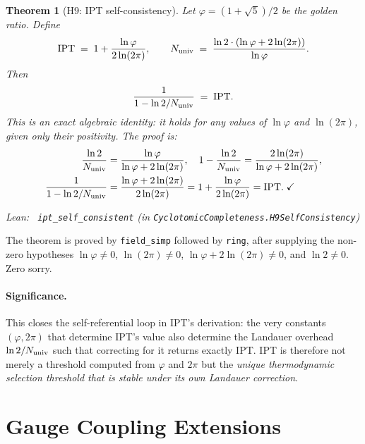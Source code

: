 \documentclass[11pt,a4paper]{article}
\newenvironment{leanref}%
  {\par\smallskip\noindent\begingroup\raggedright\textup{Lean:}~}%
  {\par\endgroup}
\newtheorem{theorem}{Theorem}[section]
\theoremstyle{definition}
\begin{document}
\begin{theorem}[H9: IPT self-consistency]\label{thm:h9}
Let $\varphi = (1+\sqrt{5})/2$ be the golden ratio.  Define
\[
  \mathrm{IPT} \;=\; 1 + \frac{\ln\varphi}{2\ln(2\pi)}, \qquad
  N_{\rm univ} \;=\; \frac{\ln 2 \cdot (\ln\varphi + 2\ln(2\pi))}{\ln\varphi}.
\]
Then
\[
  \frac{1}{1 - \ln 2 / N_{\rm univ}} \;=\; \mathrm{IPT}.
\]
This is an exact algebraic identity: it holds for any values of $\ln\varphi$ and
$\ln(2\pi)$, given only their positivity.  The proof is:
\begin{align*}
  \frac{\ln 2}{N_{\rm univ}} &= \frac{\ln\varphi}{\ln\varphi + 2\ln(2\pi)},
  \quad
  1 - \frac{\ln 2}{N_{\rm univ}} = \frac{2\ln(2\pi)}{\ln\varphi + 2\ln(2\pi)}, \\
  \frac{1}{1 - \ln 2/N_{\rm univ}} &= \frac{\ln\varphi + 2\ln(2\pi)}{2\ln(2\pi)}
  = 1 + \frac{\ln\varphi}{2\ln(2\pi)} = \mathrm{IPT}. \;\checkmark
\end{align*}

\begin{leanref} \lstinline|ipt_self_consistent|
\textup{(in \texttt{CyclotomicCompleteness.H9SelfConsistency})}
\end{leanref}
\end{theorem}

The theorem is proved by \lstinline|field_simp| followed by \lstinline|ring|,
after supplying the non-zero hypotheses $\ln\varphi \neq 0$, $\ln(2\pi) \neq 0$,
$\ln\varphi + 2\ln(2\pi) \neq 0$, and $\ln 2 \neq 0$.  Zero sorry.

\paragraph{Significance.}  This closes the self-referential loop in IPT's derivation:
the very constants $(\varphi, 2\pi)$ that determine IPT's value also determine the
Landauer overhead $\ln 2/N_{\rm univ}$ such that correcting for it returns exactly IPT.
IPT is therefore not merely a threshold computed from $\varphi$ and $2\pi$ but the
\emph{unique thermodynamic selection threshold that is stable under its own Landauer
correction}.

\section{Gauge Coupling Extensions}\label{sec:gaugecoupling-ext}
\end{document}
